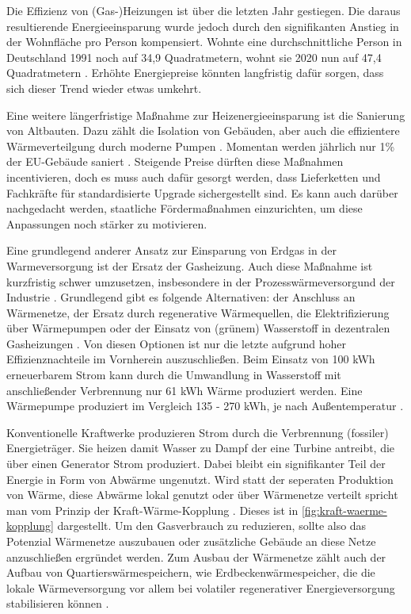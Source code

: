 Die Effizienz von (Gas-)Heizungen ist über die letzten Jahr gestiegen. Die daraus resultierende Energieeinsparung wurde jedoch durch den signifikanten Anstieg in der Wohnfläche pro Person kompensiert. Wohnte eine durchschnittliche Person in Deutschland 1991 noch auf 34,9 Quadratmetern, wohnt sie 2020 nun auf 47,4 Quadratmetern \cite{clausen2022}. Erhöhte Energiepreise könnten langfristig dafür sorgen, dass sich dieser Trend wieder etwas umkehrt.

Eine weitere längerfristige Maßnahme zur Heizenergieeinsparung ist die Sanierung von Altbauten. 
Dazu zählt die Isolation von Gebäuden, aber auch die effizientere Wärmeverteilgung durch moderne Pumpen \cite{ei1}.
Momentan werden jährlich nur 1\% der EU-Gebäude saniert \cite{iea2022}. Steigende Preise dürften diese Maßnahmen incentivieren, doch es muss auch dafür gesorgt werden, dass Lieferketten und Fachkräfte für standardisierte Upgrade sichergestellt sind. Es kann auch darüber nachgedacht werden, staatliche Fördermaßnahmen einzurichten, um diese Anpassungen noch stärker zu motivieren.

Eine grundlegend anderer Ansatz zur Einsparung von Erdgas in der Warmeversorgung ist der Ersatz der Gasheizung. Auch diese Maßnahme ist kurzfristig schwer umzusetzen, insbesondere in der Prozesswärmeversorgund der Industrie \cite{leo}. Grundlegend gibt es folgende Alternativen: der Anschluss an Wärmenetze, der Ersatz durch regenerative Wärmequellen, die Elektrifizierung über Wärmepumpen oder der Einsatz von (grünem) Wasserstoff in dezentralen Gasheizungen \cite{clausen2022}.
Von diesen Optionen ist nur die letzte aufgrund hoher Effizienznachteile im Vornherein auszuschließen. Beim Einsatz von 100 kWh erneuerbarem Strom kann durch die Umwandlung in Wasserstoff mit anschließender Verbrennung 
nur 61 kWh Wärme produziert werden. Eine Wärmepumpe produziert im Vergleich 135 - 270 kWh, je nach Außentemperatur \cite{agora-wasserstoff}.

Konventionelle Kraftwerke produzieren Strom durch die Verbrennung (fossiler) Energieträger. Sie heizen damit Wasser zu Dampf der eine Turbine antreibt, die über einen Generator Strom produziert. Dabei bleibt ein signifikanter Teil der Energie in Form von Abwärme ungenutzt. Wird statt der seperaten Produktion von Wärme, diese Abwärme lokal genutzt oder über Wärmenetze verteilt spricht man vom Prinzip der Kraft-Wärme-Kopplung \cite{kwk}. Dieses ist in \autoref{fig:kraft-waerme-kopplung} dargestellt. 
Um den Gasverbrauch zu reduzieren, sollte also das Potenzial Wärmenetze auszubauen oder zusätzliche Gebäude an diese Netze anzuschließen ergründet werden.
Zum Ausbau der Wärmenetze zählt auch der Aufbau von Quartierswärmespeichern, wie Erdbeckenwärmespeicher, die die lokale Wärmeversorgung vor allem bei volatiler regenerativer Energieversorgung stabilisieren können \cite{clausen2022}.


